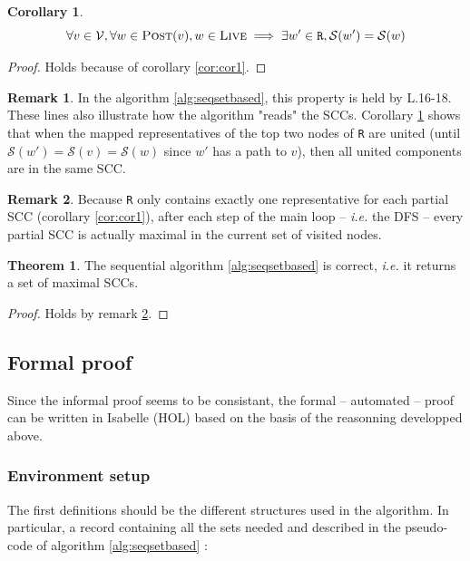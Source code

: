 \documentclass[a4 paper, 12pt]{article}
\theoremstyle{definition}
\newtheorem{theorem}{Theorem}
\newtheorem{corollary}{Corollary}[lemma]
\newtheorem{remark}{Remark}
\begin{document}
\begin{corollary}\label{cor:cor2}
    \begin{equation*}
        \forall v \in \mathcal{V}, \forall w \in \textsc{Post}(v), w \in \textsc{Live} \implies \exists w' \in \texttt{R}, \mathcal{S}(w') = \mathcal{S}(w)
    \end{equation*}
\end{corollary}

\begin{proof}
    Holds because of corollary \ref{cor:cor1}.
\end{proof}

\begin{remark}
    In the algorithm \ref{alg:seqsetbased}, this property is held by L.16-18. These lines also illustrate how the algorithm "reads" the SCCs. Corollary \ref{cor:cor2} shows that when the mapped representatives of the top two nodes of \texttt{R} are united (until $\mathcal{S}(w') = \mathcal{S}(v) = \mathcal{S}(w)$ since $w'$ has a path to $v$), then all united components are in the same SCC.
\end{remark}

\begin{remark}\label{rem:proof}
    Because \texttt{R} only contains exactly one representative for each partial SCC (corollary \ref{cor:cor1}), after each step of the main loop -- \textit{i.e.} the DFS -- every partial SCC is actually maximal in the current set of visited nodes.
\end{remark}

\begin{theorem}
    The sequential algorithm \ref{alg:seqsetbased} is correct, \textit{i.e.} it returns a set of maximal SCCs.
\end{theorem}
\begin{proof}
    Holds by remark \ref{rem:proof}.
\end{proof}

\pagebreak

\subsection{Formal proof}
Since the informal proof seems to be consistant, the formal -- automated -- proof can be written in Isabelle (HOL) based on the basis of the reasonning developped above.

\subsubsection{Environment setup}
The first definitions should be the different structures used in the algorithm. In particular, a record containing all the sets needed and described in the pseudo-code of algorithm \ref{alg:seqsetbased} :
\end{document}
